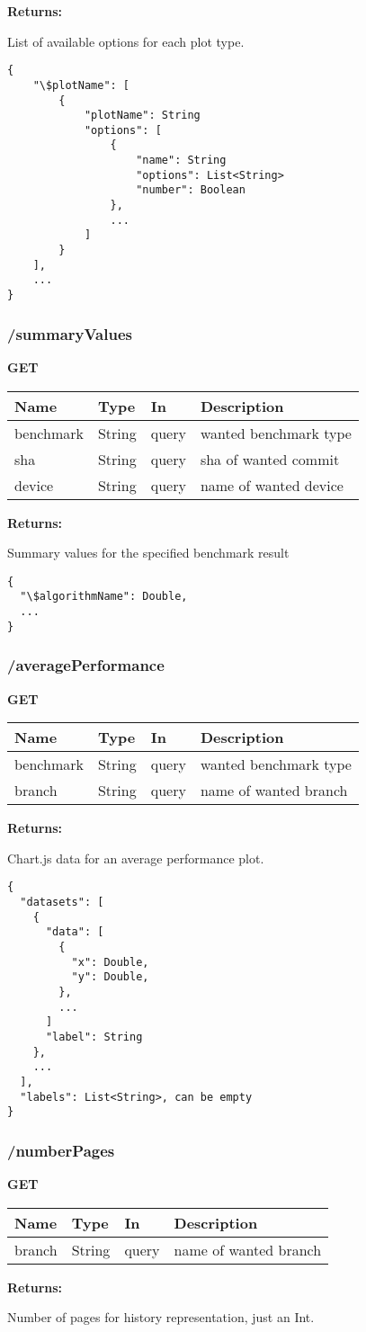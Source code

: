 \textbf{Returns: }

List of available options for each plot type.
\begin{lstlisting}
{
    "\$plotName": [
        {
            "plotName": String
            "options": [
                {
                    "name": String
                    "options": List<String>
                    "number": Boolean
                },
                ...
            ]
        }
    ],
    ...
}
\end{lstlisting}

\subsubsection*{/summaryValues}

\textbf{GET}

\begin{tabular}{ l l l l }
  Name & Type & In & Description \\ 
  \hline
  benchmark & String & query & wanted benchmark type \\
  sha & String & query & sha of wanted commit \\
  device & String & query & name of wanted device \\
  \hline
\end{tabular}

\textbf{Returns: }

Summary values for the specified benchmark result
\begin{lstlisting}
{
  "\$algorithmName": Double,
  ...
}
\end{lstlisting}


\subsubsection*{/averagePerformance}

\textbf{GET}

\begin{tabular}{ l l l l }
  Name & Type & In & Description \\ 
  \hline
  benchmark & String & query & wanted benchmark type \\
  branch & String & query & name of wanted branch \\
  \hline
\end{tabular}

\textbf{Returns: }

Chart.js data for an average performance plot.
\begin{lstlisting}
{
  "datasets": [
    {
      "data": [
        {
          "x": Double,
          "y": Double,
        },
        ...
      ]
      "label": String
    },
    ...
  ],
  "labels": List<String>, can be empty
}
\end{lstlisting}

\subsubsection*{/numberPages}

\textbf{GET}

\begin{tabular}{ l l l l }
  Name & Type & In & Description \\ 
  \hline
  branch & String & query & name of wanted branch \\
  \hline
\end{tabular}

\textbf{Returns: }

Number of pages for history representation, just an Int.
